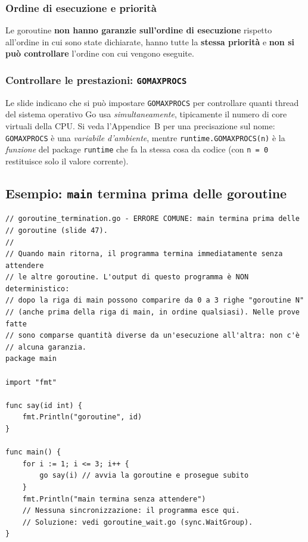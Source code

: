 \documentclass[11pt,a4paper]{report}
\newcommand{\cod}[1]{\texttt{#1}}
\begin{document}
\subsubsection{Ordine di esecuzione e priorità}

Le goroutine \textbf{non hanno garanzie sull'ordine di esecuzione} rispetto
all'ordine in cui sono state dichiarate, hanno tutte la \textbf{stessa priorità}
e \textbf{non si può controllare} l'ordine con cui vengono eseguite.

\subsubsection{Controllare le prestazioni: \texttt{GOMAXPROCS}}

Le slide indicano che si può impostare \cod{GOMAXPROCS} per controllare quanti
thread del sistema operativo Go usa \emph{simultaneamente}, tipicamente il
numero di core virtuali della CPU. Si veda l'Appendice~B per una precisazione sul
nome: \cod{GOMAXPROCS} è una \emph{variabile d'ambiente}, mentre
\cod{runtime.GOMAXPROCS(n)} è la \emph{funzione} del package \cod{runtime} che
fa la stessa cosa da codice (con \cod{n = 0} restituisce solo il valore corrente).

\subsection{Esempio: \texttt{main} termina prima delle goroutine}

\begin{lstlisting}[style=gocode,caption={\texttt{06\_concurrency/goroutine\_termination.go}}]
// goroutine_termination.go - ERRORE COMUNE: main termina prima delle
// goroutine (slide 47).
//
// Quando main ritorna, il programma termina immediatamente senza attendere
// le altre goroutine. L'output di questo programma è NON deterministico:
// dopo la riga di main possono comparire da 0 a 3 righe "goroutine N"
// (anche prima della riga di main, in ordine qualsiasi). Nelle prove fatte
// sono comparse quantità diverse da un'esecuzione all'altra: non c'è
// alcuna garanzia.
package main

import "fmt"

func say(id int) {
	fmt.Println("goroutine", id)
}

func main() {
	for i := 1; i <= 3; i++ {
		go say(i) // avvia la goroutine e prosegue subito
	}
	fmt.Println("main termina senza attendere")
	// Nessuna sincronizzazione: il programma esce qui.
	// Soluzione: vedi goroutine_wait.go (sync.WaitGroup).
}
\end{lstlisting}
\end{document}
